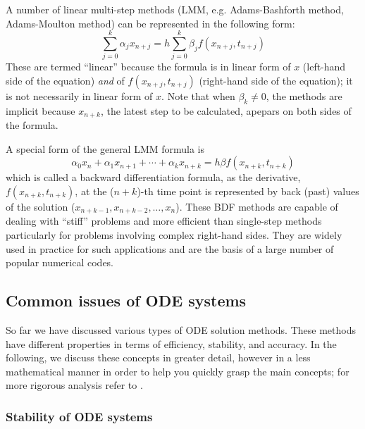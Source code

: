 \documentclass[a4paper,11pt]{article}
\theoremstyle{definition}
\begin{document}
A number of linear multi-step methods (LMM, e.g. Adams-Bashforth method, Adams-Moulton method)
can be represented in the following form:
\begin{equation} 
	\sum_{j=0}^k \alpha_j x_{n+j} = h \sum_{j=0}^k \beta_j f ( x_{n+j}, t_{n+j} )
\end{equation}
\noindent These are termed ``linear'' because the formula is in linear form of $x$ (left-hand side of the equation)
\emph{and} of $f ( x_{n+j}, t_{n+j} )$ (right-hand side of the equation); it is not necessarily in linear form of $x$.
Note that when $\beta_k \neq 0$, the methods are implicit because $x_{n+k}$, the latest step to be
calculated, apepars on both sides of the formula.

A special form of the general LMM formula is
\begin{equation} 
	\alpha_0 x_n + \alpha_1 x_{n+1} + \cdots + \alpha_k x_{n+k} = h \beta f ( x_{n+k}, t_{n+k} )
\end{equation}
\noindent which is called a backward differentiation formula, as the derivative, $f ( x_{n+k}, t_{n+k} )$,
at the ($n+k$)-th time point is represented by back (past) values of the solution
($x_{n+k-1}, x_{n+k-2}, \ldots, x_n$). These BDF methods are capable of dealing with ``stiff'' problems and more efficient than 
single-step methods particularly for problems involving complex right-hand sides. They are widely used
in practice for such applications and are the basis of a large number of popular numerical codes.

\subsection{Common issues of ODE systems}
So far we have discussed various types of ODE solution methods.
These methods have different properties in terms of efficiency, stability, and accuracy.
In the following, we discuss these concepts in greater detail, however in a less mathematical manner in order to
help you quickly grasp the main concepts; for more rigorous analysis refer to \citep{Brenan1989, Hangos2001}.

\subsubsection*{Stability of ODE systems}
\end{document}

